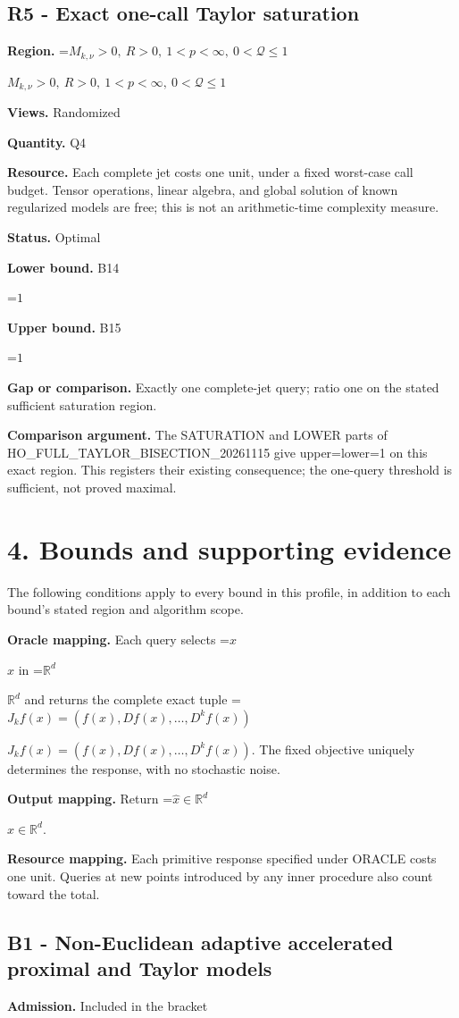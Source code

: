 \documentclass[10pt,a4paper]{article}
\newcommand{\AtlasMath}[1]{\par\begingroup\centering\setbox0=\hbox{$\displaystyle #1$}\ifdim\wd0>1.4\linewidth\typeout{ATLAS WIDE FORMULA: \the\wd0}\fi\ifdim\wd0>\linewidth\resizebox{\linewidth}{!}{\box0}\else\box0\fi\par\endgroup}
\newcommand{\AtlasInlineMath}[1]{\begingroup\setbox0=\hbox{$#1$}\ifdim\wd0>.4\linewidth\endgroup\AtlasMath{#1}\else\endgroup$#1$\fi}
\begin{document}
\subsection{R5 - Exact one-call Taylor saturation}
\textbf{Region.} \AtlasInlineMath{M_{k,\nu}>0,\ R>0,\ 1<p<\infty,\ 0<\mathcal{Q}\le1}

\textbf{Views.} Randomized

\textbf{Quantity.} Q4

\textbf{Resource.} Each complete jet costs one unit, under a fixed worst-case call budget. Tensor operations, linear algebra, and global solution of known regularized models are free; this is not an arithmetic-time complexity measure.

\textbf{Status.} Optimal

\textbf{Lower bound.} B14

\AtlasMath{1}
\textbf{Upper bound.} B15

\AtlasMath{1}
\textbf{Gap or comparison.} Exactly one complete-jet query; ratio one on the stated sufficient saturation region.

\textbf{Comparison argument.} The SATURATION and LOWER parts of HO\_\allowbreak{}FULL\_\allowbreak{}TAYLOR\_\allowbreak{}BISECTION\_\allowbreak{}20261115 give upper=lower=1 on this exact region. This registers their existing consequence; the one-query threshold is sufficient, not proved maximal.

\section{4. Bounds and supporting evidence}
The following conditions apply to every bound in this profile, in addition to each bound's stated region and algorithm scope.

\textbf{Oracle mapping.} Each query selects \AtlasInlineMath{x} in \AtlasInlineMath{\mathbb{R}^d} and returns the complete exact tuple \AtlasInlineMath{J_{k}f(x)=(f(x),Df(x),\ldots,D^{k}f(x))}. The fixed objective uniquely determines the response, with no stochastic noise.

\textbf{Output mapping.} Return \AtlasInlineMath{\widehat{x}\in \mathbb{R}^d}.

\textbf{Resource mapping.} Each primitive response specified under ORACLE costs one unit. Queries at new points introduced by any inner procedure also count toward the total.

\subsection{B1 - Non-Euclidean adaptive accelerated proximal and Taylor models}
\textbf{Admission.} Included in the bracket
\end{document}
